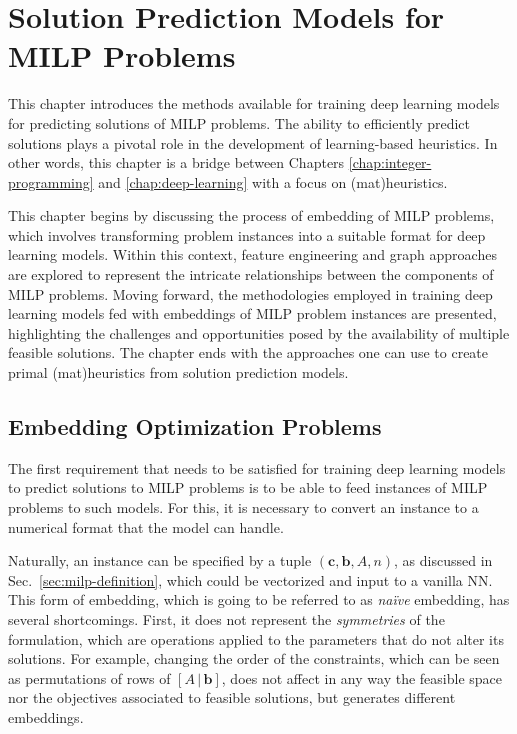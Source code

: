 

\chapter{Solution Prediction Models for MILP Problems}\label{chap:solution-prediction}


This chapter introduces the methods available for training deep learning models for predicting solutions of MILP problems.
The ability to efficiently predict solutions plays a pivotal role in the development of learning-based heuristics.
In other words, this chapter is a bridge between Chapters \ref{chap:integer-programming} and \ref{chap:deep-learning} with a focus on (mat)heuristics.

This chapter begins by discussing the process of embedding of MILP problems, which involves transforming problem instances into a suitable format for deep learning models.
Within this context, feature engineering and graph approaches are explored to represent the intricate relationships between the components of MILP problems.
Moving forward, the methodologies employed in training deep learning models fed with embeddings of MILP problem instances are presented, highlighting the challenges and opportunities posed by the availability of multiple feasible solutions.
The chapter ends with the approaches one can use to create primal (mat)heuristics from solution prediction models.


\section{Embedding Optimization Problems}\label{sec:embedding}

The first requirement that needs to be satisfied for training deep learning models to predict solutions to MILP problems is to be able to feed instances of MILP problems to such models.
For this, it is necessary to convert an instance to a numerical format that the model can handle.

Naturally, an instance can be specified by a tuple $\left( \bm{c}, \bm{b}, A, n \right)$, as discussed in Sec.~\ref{sec:milp-definition}, which could be vectorized and input to a vanilla NN.
This form of embedding, which is going to be referred to as \emph{naïve} embedding, has several shortcomings.
First, it does not represent the \emph{symmetries} of the formulation, which are operations applied to the parameters that do not alter its solutions.
For example, changing the order of the constraints, which can be seen as permutations of rows of $\left[ A\, | \,\bm{b} \right] $, does not affect in any way the feasible space nor the objectives associated to feasible solutions, but generates different embeddings.


